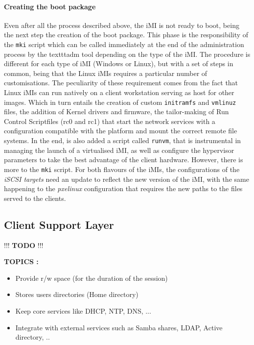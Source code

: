 
\paragraph{Creating the boot package}
\label{par:createboot_imi}
Even after all the process described above, the iMI is not ready to boot, being the next step the creation of the boot package. This phase is the responsibility of the \texttt{mki} script which can be called immediately at the end of the administration process by the texttt{adm} tool depending on the type of the iMI.
The procedure is different for each type of iMI (Windows or Linux), but with a set of steps in common, being that the Linux iMIs requires a particular number of customisations. The peculiarity of these requirement comes from the fact that Linux iMIs can run natively on a client workstation serving as host for other images. Which in turn entails the creation of custom \texttt{initramfs} and \texttt{vmlinuz} files, the addition of Kernel drivers and firmware, the tailor-making of Run Control Scriptfiles (rc0 and rc1) that start the network services with a configuration compatible with the platform and mount the correct remote file systems. In the end, is also added a script called \texttt{runvm}, that is instrumental in managing the launch of a virtualised iMI, as well as configure the hypervisor parameters to take the best advantage of the client hardware.
However, there is more to the \texttt{mki} script. For both flavours of the iMIs, the configurations of the \textit{iSCSI targets} need an update to reflect the new version of the iMI, with the same happening to the \textit{pxelinux} configuration that requires the new paths to the files served to the clients.


\subsection{Client Support Layer}
\label{sub:icbd_architecture_client}


!!! \textbf{TODO} !!!

\textbf{TOPICS :}
\begin{itemize}
	\item Provide r/w space (for the duration of the session)
	\item Stores users directories (Home directory)
	\item Keep core services like DHCP, NTP, DNS, ...
	\item Integrate with external services such as Samba shares, LDAP, Active directory, ..
\end{itemize}


